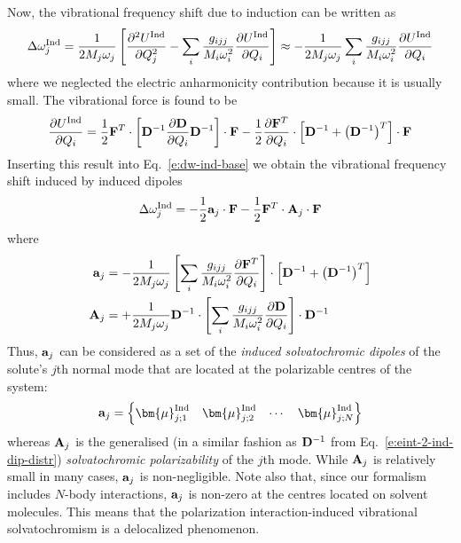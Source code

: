 \documentclass[a4paper,titlepage,twoside,fleqn,12pt]{book}
\newcommand{\BM}[1]{\bm{#1}}
\newcommand{\fderiv}[2]{\ensuremath{
    \frac{\partial #1}{\partial #2}}}
\newcommand{\sderiv}[2]{\ensuremath{
    \frac{\partial^2 #1}{\partial #2^2}
    }}
\begin{document}
\begin{refsection}
Now, the vibrational frequency shift due to induction can be written
as
%
\begin{equation}\label{e:dw-ind-base}
\Delta \omega_j^{\rm Ind} =
\frac{1}{2M_j\omega_j} \left[ 
\sderiv{U^{\rm Ind}}{Q_j} -
\sum_i \frac{g_{ijj}}{M_i\omega_i^2}\fderiv{U^{\rm Ind}}{Q_i}
\right]
\approx 
-\frac{1}{2M_j\omega_j}\sum_i \frac{g_{ijj}}{M_i\omega_i^2}\fderiv{U^{\rm Ind}}{Q_i}
\end{equation}
%
where we neglected the electric anharmonicity contribution because it is usually small.
The vibrational force is found to be
%
\begin{equation} \label{e:vibr-force-ind}
\fderiv{U^{\rm Ind}}{Q_i} = \frac{1}{2} {\bf F}^{T} \cdot
     \left[ 
           {\bf D}^{-1} \fderiv{{\bf D}}{Q_i} {\bf D}^{-1}
     \right] \cdot {\bf F}
     - \frac{1}{2} \fderiv{{\bf F}^{T}}{Q_i} \cdot
     \left[
            {\bf D}^{-1} + \left({\bf D}^{-1} \right)^T
     \right] \cdot {\bf F}
\end{equation}
%
Inserting this result into Eq.~\eqref{e:dw-ind-base}
we obtain the vibrational frequency shift induced by induced dipoles
%
\begin{equation}\label{e:dw-ind-avec}
\Delta\omega_j^{\rm Ind} = - \frac{1}{2}                 {\bf a}_j \cdot {\bf F} 
                           - \frac{1}{2} {\bf F}^T \cdot {\bf A}_j \cdot {\bf F}
\end{equation}
%
where
%
\begin{subequations} \label{e:a-A}
 \begin{align}
 {\bf a}_j &= -\frac{1}{2M_j\omega_j} \left[ \sum_i \frac{g_{ijj}}{M_i\omega_i^2} 
               \fderiv{{\bf F}^T}{Q_i} \right] \cdot \left[ {\bf D}^{-1} + \left({\bf D}^{-1}\right)^T\right]\\
%
 {\bf A}_j &= +\frac{1}{2M_j\omega_j} {\bf D}^{-1} \cdot 
               \left[ \sum_i \frac{g_{ijj}}{M_i\omega_i^2} \fderiv{{\bf D}}{Q_i} \right] 
               \cdot {\bf D}^{-1}
 \end{align}
\end{subequations}
%
Thus, ${\bf a}_j$ can be considered as a set of the \emph{induced
solvatochromic dipoles} of the solute's $j$th normal mode that are 
located at the polarizable centres of the system:
%
\begin{equation} \label{e:a-vec}
 {\bf a}_j =
 \begin{Bmatrix}
  {\BM \mu}_{j;1}^{\rm Ind} & {\BM \mu}_{j;2}^{\rm Ind} & \cdots & {\BM \mu}_{j;N}^{\rm Ind}
 \end{Bmatrix}
\end{equation}
%
whereas ${\bf A}_j$ is the generalised (in a similar fashion as ${\bf D}^{-1}$ 
from Eq.~\eqref{e:eint-2-ind-dip-distr}) \emph{solvatochromic polarizability} of the $j$th mode.
While ${\bf A}_j$ is relatively small in many cases, ${\bf a}_j$ is non\hyp{}negligible.
Note also that, since our formalism includes $N$\hyp{}body interactions,
${\bf a}_j$ is non\hyp{}zero at the centres located on solvent molecules.
This means that the polarization interaction\hyp{}induced vibrational solvatochromism
is a delocalized phenomenon. 


\end{refsection}
\end{document}
